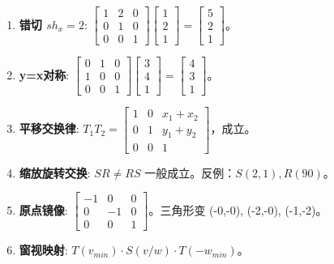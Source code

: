 \documentclass[UTF8]{ctexart}
\begin{document}
\begin{enumerate}
    \item \textbf{错切 $sh_x=2$}: $\begin{bmatrix} 1&2&0 \\ 0&1&0 \\ 0&0&1 \end{bmatrix} \begin{bmatrix} 1\\2\\1 \end{bmatrix} = \begin{bmatrix} 5\\2\\1 \end{bmatrix}$。
    \item \textbf{y=x对称}: $\begin{bmatrix} 0&1&0 \\ 1&0&0 \\ 0&0&1 \end{bmatrix} \begin{bmatrix} 3\\4\\1 \end{bmatrix} = \begin{bmatrix} 4\\3\\1 \end{bmatrix}$。
    \item \textbf{平移交换律}: $T_1 T_2 = \begin{bmatrix} 1&0&x_1+x_2 \\ 0&1&y_1+y_2 \\ 0&0&1 \end{bmatrix}$，成立。
    \item \textbf{缩放旋转交换}: $S R \ne R S$ 一般成立。反例：$S(2,1), R(90)$。
    \item \textbf{原点镜像}: $\begin{bmatrix} -1&0&0 \\ 0&-1&0 \\ 0&0&1 \end{bmatrix}$。三角形变 (-0,-0), (-2,-0), (-1,-2)。
    \item \textbf{窗视映射}: $T(v_{min}) \cdot S(v/w) \cdot T(-w_{min})$。
\end{enumerate}
\end{document}
